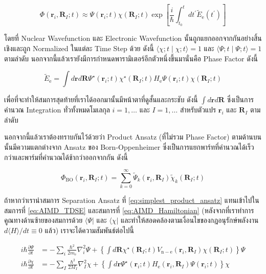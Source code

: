 \begin{equation}
  \label{eq:simplest_product_ansatz}
  \Phi\left(\mathbf{r}_i,\mathbf{R}_I ; t\right)
  \approx
  \Psi\left(\mathbf{r}_i ; t\right)
  \chi\left(\mathbf{R}_I ; t\right)
  \exp \left[\frac{i}{\hbar} \int_{t_0}^t d t^{\prime} \tilde{E}_{\mathrm{e}}\left(t^{\prime}\right)\right]
\end{equation}

\noindent โดยที่ Nuclear Wavefunction และ Electronic Wavefunction นั้นถูกแยกออกจากกันอย่างสิ้นเชิงและถูก Normalized ในแต่ละ
Time Step ด้วย ดังนี้ $\langle\chi ; t \mid \chi ; t\rangle=1$ และ $\langle\Psi ; t \mid \Psi ; t\rangle=1$ ตามลำดับ
นอกจากนี้แล้วเรายังมีการกำหนดพารามิเตอร์อีกตัวหนึ่งขึ้นมานั่นคือ Phase Factor ดังนี้

\begin{equation}
  \tilde{E}_{\mathrm{e}}
  =
  \int d \mathbf{r} d \mathbf{R} \Psi^{\star}\left(\mathbf{r}_i ; t\right)
  \chi^{\star}\left(\mathbf{R}_I ; t\right)
  H_{\mathrm{e}} \Psi\left(\mathbf{r}_i ; t\right)
  \chi\left(\mathbf{R}_I ; t\right)
\end{equation}

\noindent เพื่อที่จะทำให้สมการสุดท้ายที่เราได้ออกมานั้นมีหน้าตาที่ดูสั้นและกระชับ ดังนี้ $\int d \mathbf{r} d \mathbf{R}$ ซึ่งเป็นการคำนวณ
Integration ทั่วทั้งหมดโมเลกุล $i=1, \ldots$ และ $I=1, \ldots$ สำหรับตัวแปร $\mathbf{r}_i$ และ $\mathbf{R}_I$ ตามลำดับ

นอกจากนี้แล้วเราต้องทราบกันไว้ด้วยว่า Product Ansatz (ที่ไม่รวม Phase Factor) ตามด้านบนนั้นมีความแตกต่างจาก Ansatz ของ Born-Oppenheimer
ซึ่งเป็นการแยกพาร์ทที่คำนวณได้เร็วกว่าและพาร์มที่คำนวณได้ช้ากว่าออกจากกัน ดังนี้

\begin{equation}
  \Phi_{\mathrm{BO}}\left(\mathbf{r}_i,\mathbf{R}_I ; t\right)
  =
  \sum_{k=0}^{\infty}
  \tilde{\Psi}_k\left(\mathbf{r}_i,\mathbf{R}_I\right)
  \tilde{\chi}_k\left(\mathbf{R}_I ; t\right)
\end{equation}

ถ้าหากว่าเรานำสมการ Separation Ansatz ที่ \eqref{eq:simplest_product_ansatz} แทนเข้าไปในสมการที่ \eqref{eq:AIMD_TDSE}
และสมการที่ \eqref{eq:AIMD_Hamiltonian} (หลังจากที่เราทำการคูณทางด้านซ้ายของสมการด้วย  $\langle\Psi|$ และ $\langle\chi|$
และทำให้สอดคล้องตามเงื่อนไขของกฎอนุรักษ์พลังงาน $d\langle H\rangle / d t \equiv 0$ แล้ว) เราจะได้ความสัมพันธ์ต่อไปนี้

\begin{align}
  \label{eq:AIMD_coupled_TDSCF_1}
  i \hbar \frac{\partial \Psi}{\partial t}
   & =
  - \sum_i \frac{\hbar^2}{2 m_{\mathrm{e}}} \nabla_i^2 \Psi
  + \left\{\int d \mathbf{R} \chi^{\star}\left(\mathbf{R}_I ; t\right)
  V_{\mathrm{n}-\mathrm{e}}\left(\mathbf{r}_i,\mathbf{R}_I\right)
  \chi\left(\mathbf{R}_I ; t\right)\right\} \Psi \\
  \label{eq:AIMD_coupled_TDSCF_2}
  i \hbar \frac{\partial \chi}{\partial t}
   & =
  - \sum_I \frac{\hbar^2}{2 M_I} \nabla_I^2 \chi
  + \left\{\int d \mathbf{r} \Psi^{\star}\left(\mathbf{r}_i ; t\right)
  H_{\mathrm{e}}\left(\mathbf{r}_i,\mathbf{R}_I\right)
  \Psi\left(\mathbf{r}_i ; t\right)\right\} \chi
\end{align}

